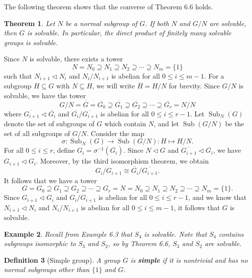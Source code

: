 \documentclass[10pt]{article}
\makeatletter
\newcommand{\norm}{\triangleleft}
\DeclareMathOperator{\Sub}{Sub}
\theoremstyle{newstyle}
\newtheorem{thm}{Theorem}[section]
\newtheorem{defn}[thm]{Definition}
\newtheorem{exmp}[thm]{Example}
\newenvironment{pf}[1][\proofname]{\par
  \pushQED{\qed}%
  \normalfont \topsep0\p@\relax
  \trivlist
  \item[\hskip\labelsep\scshape
  #1\@addpunct{.}]\ignorespaces
}{%
  \popQED\endtrivlist\@endpefalse
}
\makeatother
\begin{document}
The following theorem shows that the converse of Theorem 6.6 holds. 

\begin{thm}
Let $N$ be a normal subgroup of $G$. If both $N$ and $G/N$ are solvable, then $G$ is solvable. 
In particular, the direct product of finitely many solvable groups is solvable. 
\end{thm}
\begin{pf}
Since $N$ is solvable, there exists a tower 
\[ N = N_0 \supseteq N_1 \supseteq N_2 \supseteq \cdots \supseteq N_m = \{1\} \]
such that $N_{i+1} \norm N_i$ and $N_i/N_{i+1}$ is abelian for all $0 \leq i \leq m-1$. 
For a subgroup $H \subseteq G$ with $N \subseteq H$, we will write $\overline H = H/N$ for 
brevity. Since $G/N$ is solvable, we have the tower
\[ G/N = \overline G = \overline{G_0} \supseteq \overline{G_1} \supseteq \overline{G_2} 
\supseteq \cdots \supseteq \overline{G_r} = N/N \]
where $\overline{G_{i+1}} \norm \overline{G_i}$ and $\overline{G_i}/\overline{G_{i+1}}$ 
is abelian for all $0 \leq i \leq r-1$. Let $\Sub_N(G)$ denote the set of subgroups of $G$ which 
contain $N$, and let $\Sub(G/N)$ be the set of all subgroups of $G/N$. Consider the map 
\[ \sigma : \Sub_N(G) \to \Sub(G/N) : H \mapsto H/N. \]
For all $0 \leq i \leq r$, define $G_i = \sigma^{-1}(\overline{G_i})$. Since $N \norm G$ 
and $\overline{G_{i+1}} \norm \overline{G_i}$, we have $G_{i+1} \norm G_i$. 
Moreover, by the third isomorphism theorem, we obtain 
\[ G_i/G_{i+1} \cong \overline{G_i}/\overline{G_{i+1}}. \]
It follows that we have a tower 
\[ G = G_0 \supseteq G_1 \supseteq G_2 \supseteq \cdots \supseteq G_r = N = N_0 
\supseteq N_1 \supseteq N_2 \supseteq \cdots \supseteq N_m = \{1\}. \]
Since $G_{i+1} \norm G_i$ and $G_i/G_{i+1}$ is abelian for all $0 \leq i \leq r-1$, and 
we know that $N_{i+1} \norm N_i$ and $N_i/N_{i+1}$ is abelian for all $0 \leq i \leq m-1$, 
it follows that $G$ is solvable. 
\end{pf}

\begin{exmp}
Recall from Example 6.3 that $S_4$ is solvable. Note that $S_4$ contains subgroups isomorphic to 
$S_3$ and $S_2$, so by Theorem 6.6, $S_3$ and $S_2$ are solvable.
\end{exmp}

\begin{defn}[Simple group]
A group $G$ is {\bf simple} if it is nontrivial and has no normal subgroups other than 
$\{1\}$ and $G$. 
\end{defn}
\end{document}

